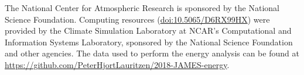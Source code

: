 \documentclass[draft,linenumbers]{agujournal}
\begin{document}
\acknowledgments
The National Center for Atmospheric Research is sponsored by the National Science Foundation. Computing resources ({\url{doi:10.5065/D6RX99HX}}) were provided by the Climate Simulation Laboratory at NCAR's Computational and Information Systems Laboratory, sponsored by the National Science Foundation and other agencies. The data used to perform the energy analysis can be found at {\url{https://github.com/PeterHjortLauritzen/2018-JAMES-energy}}.













%
%
%
%
%
%
%
%
%
%
%




\end{document}
